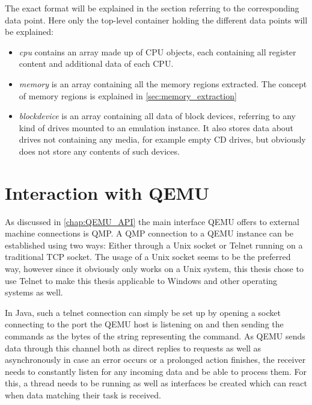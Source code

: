 The exact format will be explained in the section referring to the corresponding data point.
Here only the top-level container holding the different data points will be explained:
\begin{itemize}
    \item \emph{cpu} contains an array made up of CPU objects, each containing all register content and additional data of each CPU.
    \item \emph{memory} is an array containing all the memory regions extracted.
    The concept of memory regions is explained in \autoref{sec:memory_extraction}
    \item \emph{blockdevice} is an array containing all data of block devices,
    referring to any kind of drives mounted to an emulation instance.
    It also stores data about drives not containing any media, for example empty CD drives,
    but obviously does not store any contents of such devices.
\end{itemize}

\section{Interaction with QEMU}\label{sec:QEMU_Interaction}
As discussed in \autoref{chap:QEMU_API} the main interface QEMU offers to external machine connections is QMP.
A QMP connection to a QEMU instance can be established using two ways:
Either through a Unix socket or Telnet running on a traditional TCP socket.
The usage of a Unix socket seems to be the preferred way,
however since it obviously only works on a Unix system,
this thesis chose to use Telnet to make this thesis applicable
to Windows and other operating systems as well.

In Java, such a telnet connection can simply be set up by opening a socket connecting to the port the QEMU host is listening on
and then sending the commands as the bytes of the string representing the command.
As QEMU sends data through this channel both as direct replies to requests as well as asynchronously
in case an error occurs or a prolonged action finishes,
the receiver needs to constantly listen for any incoming data and be able to process them.
For this, a thread needs to be running as well as interfaces be created
which can react when data matching their task is received.

